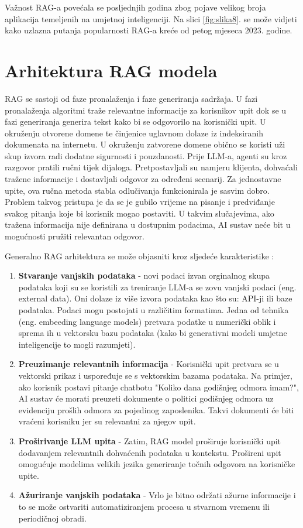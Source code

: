 \documentclass[]{foi}
\begin{document}
Važnost RAG-a povećala se posljednjih godina zbog pojave velikog broja aplikacija temeljenih na umjetnoj inteligenciji. Na slici \ref{fig:slika8}. se može vidjeti kako uzlazna putanja popularnosti RAG-a kreće od petog mjeseca 2023. godine.


\section{Arhitektura RAG modela}
RAG se sastoji od faze pronalaženja i faze generiranja sadržaja. U fazi pronalaženja algoritmi traže relevantne informacije za korisnikov upit dok se u fazi generiranja generira tekst 
kako bi se odgovorilo na korisnički upit. U okruženju otvorene domene te činjenice uglavnom dolaze iz indeksiranih dokumenata na internetu. U okruženju zatvorene domene obično se koristi 
uži skup izvora radi dodatne sigurnosti i pouzdanosti. Prije LLM-a, agenti su kroz razgovor pratili ručni tijek dijaloga. Pretpostavljali su namjeru klijenta, dohvaćali tražene informacije 
i dostavljali odgovor za određeni scenarij. Za jednostavne upite, ova ručna metoda stabla odlučivanja funkcionirala je sasvim dobro. Problem takvog pristupa je da se je gubilo vrijeme na 
pisanje i predviđanje svakog pitanja koje bi korisnik mogao postaviti. U takvim slučajevima, ako tražena informacija nije definirana u dostupnim podacima, AI sustav neće bit u mogućnosti 
pružiti relevantan odgovor\cite{ibmRAG}. 

Generalno RAG arhitektura se može objasniti kroz sljedeće karakteristike \cite{awsRAG2025}:

\begin{enumerate}
    \item \textbf{Stvaranje vanjskih podataka} - novi podaci izvan orginalnog skupa podataka koji su se koristili za treniranje LLM-a se zovu 
    vanjski podaci (eng. external data). Oni dolaze iz više izvora podataka kao što su: API-ji ili baze podataka. Podaci mogu postojati u različitim formatima.
    Jedna od tehnika (eng. embeeding language models) pretvara podatke u numerički oblik i sprema ih u vektorsku bazu podataka 
    (kako bi generativni modeli umjetne inteligencije to mogli razumjeti).
    \item \textbf{Preuzimanje relevantnih informacija} - Korisnički upit pretvara se u vektorski prikaz i uspoređuje se s vektorskim bazama podataka.
    Na primjer, ako korisnik postavi pitanje chatbotu "Koliko dana godišnjeg odmora imam?", AI sustav će morati preuzeti dokumente o politici godišnjeg 
    odmora uz evidenciju prošlih odmora za pojedinog zaposlenika. Takvi dokumenti će biti vraćeni korisniku jer su relevantni za njegov upit.
    \item \textbf{Proširivanje LLM upita} - Zatim, RAG model proširuje korisnički upit dodavanjem relevantnih dohvaćenih podataka u kontekstu. 
    Prošireni upit omogućuje modelima velikih jezika generiranje točnih odgovora na korisničke upite.
    \item \textbf{Ažuriranje vanjskih podataka} - Vrlo je bitno održati ažurne informacije i to se može ostvariti automatiziranjem procesa u stvarnom vremenu ili periodičnoj obradi. 
\end{enumerate}
\end{document}
